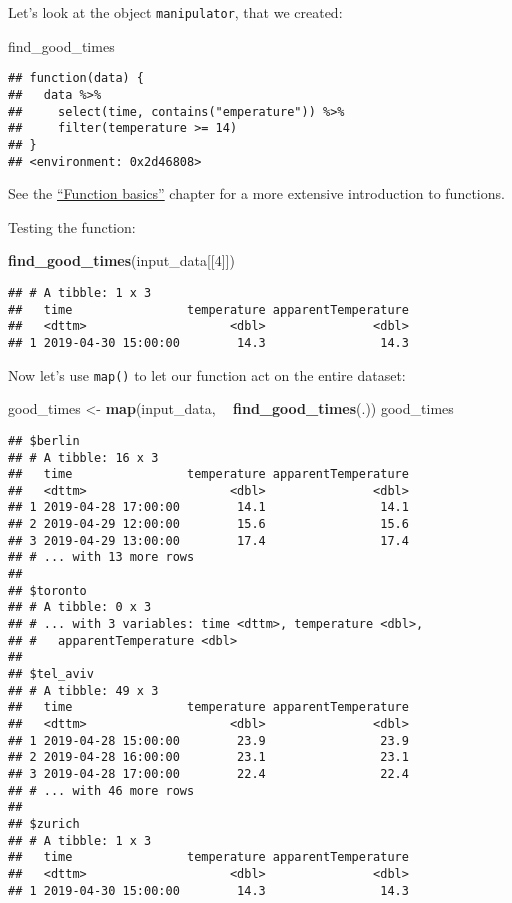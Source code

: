 \documentclass[]{book}
\newenvironment{Shaded}{\begin{snugshade}}{\end{snugshade}}
\newcommand{\DecValTok}[1]{\textcolor[rgb]{0.00,0.00,0.81}{#1}}
\newcommand{\KeywordTok}[1]{\textcolor[rgb]{0.13,0.29,0.53}{\textbf{#1}}}
\newcommand{\NormalTok}[1]{#1}
\newcommand{\OperatorTok}[1]{\textcolor[rgb]{0.81,0.36,0.00}{\textbf{#1}}}
\newcommand{\StringTok}[1]{\textcolor[rgb]{0.31,0.60,0.02}{#1}}
\begin{document}
Let's look at the object \texttt{manipulator}, that we created:

\begin{Shaded}
\begin{Highlighting}[]
\NormalTok{find_good_times}
\end{Highlighting}
\end{Shaded}

\begin{verbatim}
## function(data) {
##   data %>%
##     select(time, contains("emperature")) %>%
##     filter(temperature >= 14)
## }
## <environment: 0x2d46808>
\end{verbatim}

See the \protect\hyperlink{function-basics}{``Function basics''} chapter for a more extensive introduction to functions.

Testing the function:

\begin{Shaded}
\begin{Highlighting}[]
\KeywordTok{find_good_times}\NormalTok{(input_data[[}\DecValTok{4}\NormalTok{]])}
\end{Highlighting}
\end{Shaded}

\begin{verbatim}
## # A tibble: 1 x 3
##   time                temperature apparentTemperature
##   <dttm>                    <dbl>               <dbl>
## 1 2019-04-30 15:00:00        14.3                14.3
\end{verbatim}

Now let's use \texttt{map()} to let our function act on the entire dataset:

\begin{Shaded}
\begin{Highlighting}[]
\NormalTok{good_times <-}\StringTok{ }\KeywordTok{map}\NormalTok{(input_data, }\OperatorTok{~}\StringTok{ }\KeywordTok{find_good_times}\NormalTok{(.))}
\NormalTok{good_times}
\end{Highlighting}
\end{Shaded}

\begin{verbatim}
## $berlin
## # A tibble: 16 x 3
##   time                temperature apparentTemperature
##   <dttm>                    <dbl>               <dbl>
## 1 2019-04-28 17:00:00        14.1                14.1
## 2 2019-04-29 12:00:00        15.6                15.6
## 3 2019-04-29 13:00:00        17.4                17.4
## # ... with 13 more rows
## 
## $toronto
## # A tibble: 0 x 3
## # ... with 3 variables: time <dttm>, temperature <dbl>,
## #   apparentTemperature <dbl>
## 
## $tel_aviv
## # A tibble: 49 x 3
##   time                temperature apparentTemperature
##   <dttm>                    <dbl>               <dbl>
## 1 2019-04-28 15:00:00        23.9                23.9
## 2 2019-04-28 16:00:00        23.1                23.1
## 3 2019-04-28 17:00:00        22.4                22.4
## # ... with 46 more rows
## 
## $zurich
## # A tibble: 1 x 3
##   time                temperature apparentTemperature
##   <dttm>                    <dbl>               <dbl>
## 1 2019-04-30 15:00:00        14.3                14.3
\end{verbatim}
\end{document}
